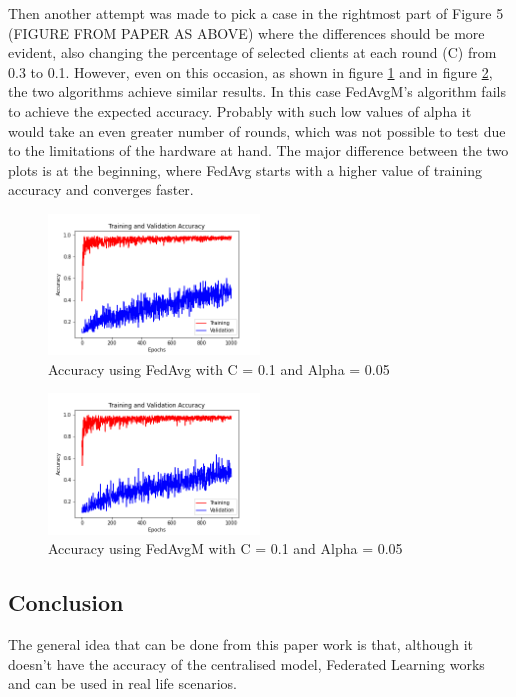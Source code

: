 \documentclass[twocolumn]{article}
\begin{document}
Then another attempt was made to pick a case in the rightmost part of Figure 5 (FIGURE FROM PAPER AS ABOVE) where the differences should be more evident, also changing the percentage of selected clients at each round (C) from 0.3 to 0.1. 
However, even on this occasion, as shown in figure \ref{AccFedAvgC0.1A0.05} and in figure \ref{AccFedAvgMC0.1A0.05}, the two algorithms achieve similar results. In this case FedAvgM's algorithm fails to achieve the expected accuracy. Probably with such low values of alpha it would take an even greater number of rounds, which was not possible to test due to the limitations of the hardware at hand. The major difference between the two plots is at the beginning, where FedAvg starts with a higher value of training accuracy and converges faster.

\begin{figure}
    \centering
    \includegraphics[width=0.5\textwidth,height=.3\textheight]{10_AccuracyFedAvg_C0.1A_0.05.png}
    \caption{Accuracy using FedAvg with C = 0.1 and Alpha = 0.05}
     \label{AccFedAvgC0.1A0.05} 
\end{figure}

\begin{figure}
    \centering
    \includegraphics[width=0.5\textwidth,height=.3\textheight]{10_AccuracyFedAvgM_C0.1_A0.05.png}
    \caption{Accuracy using FedAvgM with C = 0.1 and Alpha = 0.05}
     \label{AccFedAvgMC0.1A0.05} 
\end{figure}





\subsection{Conclusion}
The general idea that can be done from this paper work is that, although it doesn't have the accuracy of the centralised model, Federated Learning works and can be used in real life scenarios.
\end{document}
